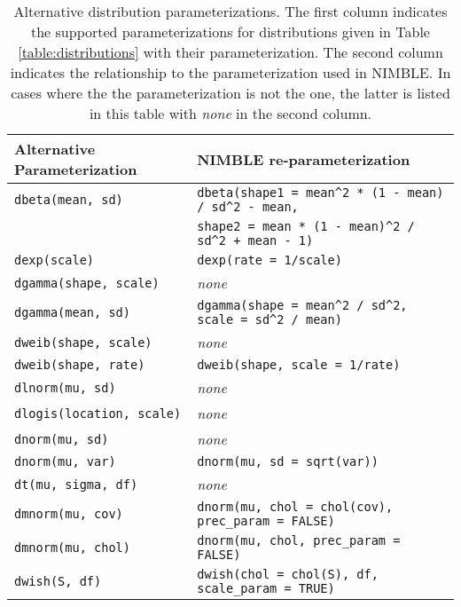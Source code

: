   \begin{center}
    \begin{longtable}{ll}
  \caption{Alternative distribution parameterizations. The first
    column indicates the supported parameterizations for
    distributions given in Table \ref{table:distributions} with their
     parameterization. The second column indicates the
    relationship to the  parameterization used in
    NIMBLE. In cases where the the  parameterization is not
    the  one, the latter is listed in this table with
    \textit{none} in the second column.} \label{table:distributions-alternates}\\
      \hline
      Alternative Parameterization & NIMBLE re-parameterization \\
      \hline \hline
\endhead
      \texttt{dbeta(mean, sd)} & \verb|dbeta(shape1 = mean^2 * (1 - mean) / sd^2 - mean,| \\
      & \verb|shape2 = mean * (1 - mean)^2 / sd^2 + mean - 1)| \\
      \texttt{dexp(scale)} & \texttt{dexp(rate = 1/scale)} \\
     \texttt{dgamma(shape, scale)} & \textit{none} \\
      \texttt{dgamma(mean, sd)} & \verb|dgamma(shape = mean^2 / sd^2, scale = sd^2 / mean)| \\
     \texttt{dweib(shape, scale)} & \textit{none} \\
     \texttt{dweib(shape, rate)} & \texttt{dweib(shape, scale = 1/rate)} \\
     \texttt{dlnorm(mu, sd)} & \textit{none} \\
     \texttt{dlogis(location, scale)} & \textit{none} \\
     \texttt{dnorm(mu, sd)} & \textit{none} \\
     \texttt{dnorm(mu, var)} & \texttt{dnorm(mu, sd = sqrt(var))} \\
     \texttt{dt(mu, sigma, df)} & \textit{none} \\
     \texttt{dmnorm(mu, cov)} & \texttt{dnorm(mu, chol = chol(cov), prec\_param = FALSE)} \\
     \texttt{dmnorm(mu, chol)} & \texttt{dnorm(mu, chol, prec\_param = FALSE)} \\
     \texttt{dwish(S, df)} & \texttt{dwish(chol = chol(S), df, scale\_param = TRUE)}\\ 
     \end{longtable}
  \end{center}
